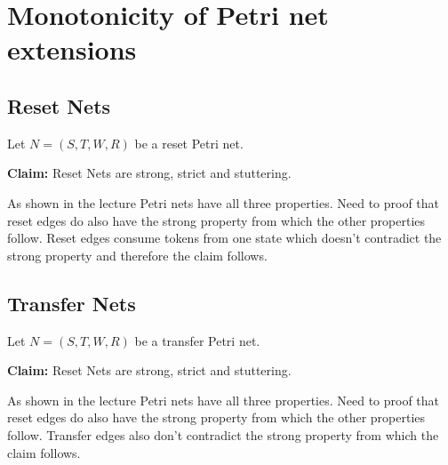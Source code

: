 \section{Monotonicity of Petri net extensions}
\subsection{Reset Nets}
Let $N=(S,T,W,R)$ be a reset Petri net.

\textbf{Claim:} Reset Nets are strong, strict and stuttering.

As shown in the lecture Petri nets have all three properties. Need to proof that reset edges do also have the strong property from which the other properties follow. Reset edges consume tokens from one state which doesn't contradict the strong property and therefore the claim follows.




\subsection{Transfer Nets}
Let $N=(S,T,W,R)$ be a transfer Petri net.

\textbf{Claim:} Reset Nets are strong, strict and stuttering.

As shown in the lecture Petri nets have all three properties. Need to proof that reset edges do also have the strong property from which the other properties follow. Transfer edges also don't contradict the strong property from which the claim follows.
